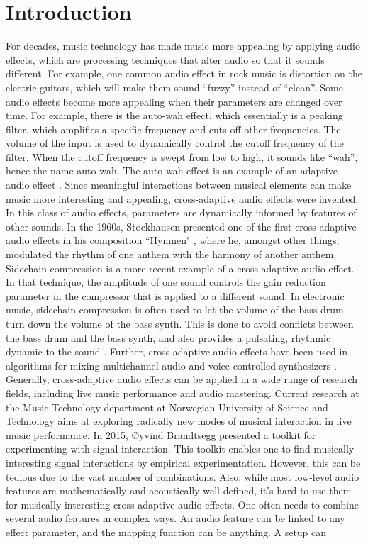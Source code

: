 \chapter{Introduction}
\label{chapter:introduction}

For decades, music technology has made music more appealing by applying audio effects, which are processing techniques that alter audio so that it sounds different. For example, one common audio effect in rock music is distortion on the electric guitars, which will make them sound “fuzzy” instead of “clean”. Some audio effects become more appealing when their parameters are changed over time. For example, there is the auto-wah effect, which essentially is a peaking filter, which amplifies a specific frequency and cuts off other frequencies. The volume of the input is used to dynamically control the cutoff frequency of the filter. When the cutoff frequency is swept from low to high, it sounds like “wah”, hence the name auto-wah. The auto-wah effect is an example of an adaptive audio effect \citep{verfaille2006}. Since meaningful interactions between musical elements can make music more interesting and appealing, cross-adaptive audio effects were invented. In this class of audio effects, parameters are dynamically informed by features of other sounds. In the 1960s, Stockhausen presented one of the first cross-adaptive audio effects in his composition ``Hymnen" \citep{moritz2003}, where he, amongst other things, modulated the rhythm of one anthem with the harmony of another anthem. Sidechain compression is a more recent example of a cross-adaptive audio effect. In that technique, the amplitude of one sound controls the gain reduction parameter in the compressor that is applied to a different sound. In electronic music, sidechain compression is often used to let the volume of the bass drum turn down the volume of the bass synth. This is done to avoid conflicts between the bass drum and the bass synth, and also provides a pulsating, rhythmic dynamic to the sound \citep{colletti2013}. Further, cross-adaptive audio effects have been used in algorithms for mixing multichannel audio \citep{reiss2011} and voice-controlled synthesizers \citep{cartwright2014}. Generally, cross-adaptive audio effects can be applied in a wide range of research fields, including live music performance and audio mastering. Current research at the Music Technology department at Norwegian University of Science and Technology aims at exploring radically new modes of musical interaction in live music performance. In 2015, Øyvind Brandtsegg presented a toolkit for experimenting with signal interaction. This toolkit enables one to find musically interesting signal interactions by empirical experimentation. However, this can be tedious due to the vast number of combinations. Also, while most low-level audio features are mathematically and acoustically well defined, it's hard to use them for musically interesting cross-adaptive audio effects. One often needs to combine several audio features in complex ways. An audio feature can be linked to any effect parameter, and the mapping function can be anything. A setup can 